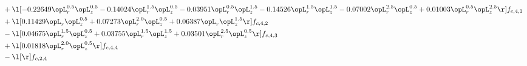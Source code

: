 \begin{alignat}{2}
& + \l[  -0.22649 \opL_r^{0.5} \opL_z^{0.5}   -0.14024 \opL_r^{1.5} \opL_z^{0.5}   -0.03951 \opL_r^{0.5} \opL_z^{1.5}   -0.14526 \opL_r^{1.5} \opL_z^{1.5}   -0.07002 \opL_r^{2.5} \opL_z^{0.5} +  0.01003 \opL_r^{0.5} \opL_z^{2.5}  \r] f_{c,4,1} \nonumber \\ 
& + \l[  0.11429 \opL_r \opL_z^{0.5} +  0.07273 \opL_r^{2.0} \opL_z^{0.5} +  0.06387 \opL_r \opL_z^{1.5}  \r] f_{c,4,2} \nonumber \\ 
& - \l[  0.04675 \opL_r^{1.5} \opL_z^{0.5} +  0.03755 \opL_r^{1.5} \opL_z^{1.5} +  0.03501 \opL_r^{2.5} \opL_z^{0.5}  \r] f_{c,4,3} \nonumber \\ 
& + \l[  0.01818 \opL_r^{2.0} \opL_z^{0.5}  \r] f_{c,4,4} \nonumber \\ 
& - \l[  \r] f_{c,2,4} \nonumber \\ 
\end{alignat} 


